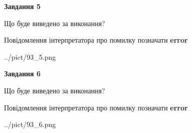 \documentclass[12pt, ukrainian]{article}
\begin{document}
{{\begin {center}\textbf{Завдання 5}\end {center}}\par
Що буде виведено за виконання? \par
Повідомлення інтерпретатора про помилку позначати \textbf{error}

\begin{center}
	{../pict/93_5.png}
\end{center}
\newpage

{\begin {center}\textbf{Завдання 6}\end {center}}\par
Що буде виведено за виконання? \par
Повідомлення інтерпретатора про помилку позначати \textbf{error}

\begin{center}
	{../pict/93_6.png}
\end{center}
\newpage

}
\end{document}
